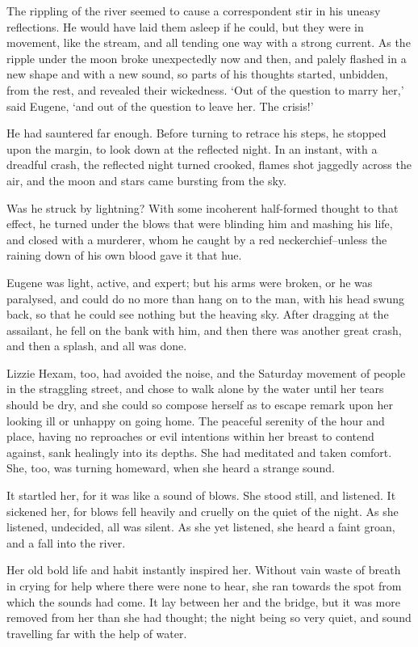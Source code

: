 The rippling of the river seemed to cause a correspondent stir in his
uneasy reflections. He would have laid them asleep if he could, but they
were in movement, like the stream, and all tending one way with a strong
current. As the ripple under the moon broke unexpectedly now and then,
and palely flashed in a new shape and with a new sound, so parts of
his thoughts started, unbidden, from the rest, and revealed their
wickedness. ‘Out of the question to marry her,’ said Eugene, ‘and out of
the question to leave her. The crisis!’

He had sauntered far enough. Before turning to retrace his steps, he
stopped upon the margin, to look down at the reflected night. In an
instant, with a dreadful crash, the reflected night turned crooked,
flames shot jaggedly across the air, and the moon and stars came
bursting from the sky.

Was he struck by lightning? With some incoherent half-formed thought
to that effect, he turned under the blows that were blinding him and
mashing his life, and closed with a murderer, whom he caught by a red
neckerchief--unless the raining down of his own blood gave it that hue.

Eugene was light, active, and expert; but his arms were broken, or he
was paralysed, and could do no more than hang on to the man, with his
head swung back, so that he could see nothing but the heaving sky. After
dragging at the assailant, he fell on the bank with him, and then there
was another great crash, and then a splash, and all was done.

Lizzie Hexam, too, had avoided the noise, and the Saturday movement of
people in the straggling street, and chose to walk alone by the water
until her tears should be dry, and she could so compose herself as
to escape remark upon her looking ill or unhappy on going home. The
peaceful serenity of the hour and place, having no reproaches or evil
intentions within her breast to contend against, sank healingly into
its depths. She had meditated and taken comfort. She, too, was turning
homeward, when she heard a strange sound.

It startled her, for it was like a sound of blows. She stood still, and
listened. It sickened her, for blows fell heavily and cruelly on the
quiet of the night. As she listened, undecided, all was silent. As she
yet listened, she heard a faint groan, and a fall into the river.

Her old bold life and habit instantly inspired her. Without vain waste
of breath in crying for help where there were none to hear, she ran
towards the spot from which the sounds had come. It lay between her and
the bridge, but it was more removed from her than she had thought; the
night being so very quiet, and sound travelling far with the help of
water.

